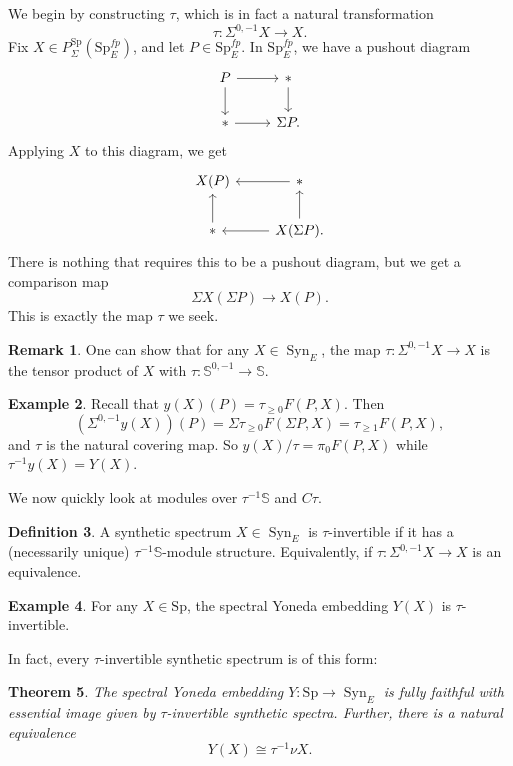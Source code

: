 \documentclass{shortart}
\newtheorem{thm}{Theorem}[section]
\theoremstyle{definition}
\newtheorem{defi}[thm]{Definition}
\newtheorem{remark}[thm]{Remark}
\newtheorem{eg}[thm]{Example}
\renewcommand\S{{\mathbb{S}}}
\newcommand\Sp{{\mathrm{Sp}}}
\DeclareMathOperator\Syn{Syn}
\begin{document}
We begin by constructing $\tau$, which is in fact a natural transformation
\[
  \tau \colon \Sigma^{0, -1} X \to X.
\]
Fix $X \in P_\Sigma^\Sp(\Sp_E^{fp})$, and let $P \in \Sp_E^{fp}$. In $\Sp_E^{fp}$, we have a pushout diagram
\[
  \begin{tikzcd}
    P \ar[r] \ar[d] & * \ar[d] \\
    * \ar[r] & \Sigma P.
  \end{tikzcd}
\]
Applying $X$ to this diagram, we get
\[
  \begin{tikzcd}
    X(P) & * \ar[l] \\
    * \ar[u] & X(\Sigma P). \ar[u] \ar[l]
  \end{tikzcd}
\]
There is nothing that requires this to be a pushout diagram, but we get a comparison map
\[
  \Sigma X(\Sigma P) \to X(P).
\]
This is exactly the map $\tau$ we seek.

\begin{remark}
  One can show that for any $X \in \Syn_E$, the map $\tau \colon \Sigma^{0, -1} X \to X$ is the tensor product of $X$ with $\tau \colon \S^{0, -1} \to \S$.
\end{remark}

\begin{eg}
  Recall that $y(X)(P) = \tau_{\geq 0} F(P, X)$. Then
  \[
    (\Sigma^{0, -1} y(X))(P) = \Sigma \tau_{\geq 0} F(\Sigma P, X) = \tau_{\geq 1} F(P, X),
  \]
  and $\tau$ is the natural covering map. So $y(X) / \tau = \pi_0 F(P, X)$ while $\tau^{-1} y(X) = Y(X)$.
\end{eg}

We now quickly look at modules over $\tau^{-1} \S$ and $C\tau$.
\begin{defi}
  A synthetic spectrum $X \in \Syn_E$ is $\tau$-invertible if it has a (necessarily unique) $\tau^{-1} \S$-module structure. Equivalently, if $\tau \colon \Sigma^{0, -1} X \to X$ is an equivalence.
\end{defi}

\begin{eg}
  For any $X \in \Sp$, the spectral Yoneda embedding $Y(X)$ is $\tau$-invertible.
\end{eg}

In fact, every $\tau$-invertible synthetic spectrum is of this form:
\begin{thm}
  The spectral Yoneda embedding $Y \colon \Sp \to \Syn_E$ is fully faithful with essential image given by $\tau$-invertible synthetic spectra. Further, there is a natural equivalence
  \[
    Y(X) \cong \tau^{-1} \nu X.
  \]
\end{thm}
\end{document}
